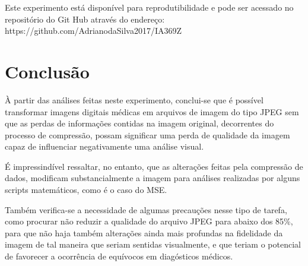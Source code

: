 \documentclass{IEEEtran}
\begin{document}
    Este experimento está disponível para reprodutibilidade e pode ser
acessado no repositório do Git Hub através do endereço:
https://github.com/AdrianodaSilva2017/IA369Z 

    \section{Conclusão}\label{conclusuxe3o}

    À partir das análises feitas neste experimento, conclui-se que é
possível transformar imagens digitais médicas em arquivos de imagem do
tipo JPEG sem que as perdas de informações contidas na imagem original,
decorrentes do processo de compressão, possam significar uma perda de
qualidade da imagem capaz de influenciar negativamente uma análise
visual.

É impressindível ressaltar, no entanto, que as alterações feitas pela
compressão de dados, modificam substancialmente a imagem para análises
realizadas por alguns scripts matemáticos, como é o caso do MSE.

Também verifica-se a necessidade de algumas precauções nesse tipo de
tarefa, como procurar não reduzir a qualidade do arquivo JPEG para
abaixo dos 85\%, para que não haja também alterações ainda mais
profundas na fidelidade da imagem de tal maneira que seriam sentidas
visualmente, e que teriam o potencial de favorecer a ocorrência de
equívocos em diagósticos médicos. 

    


    
    



    
    
\end{document}
